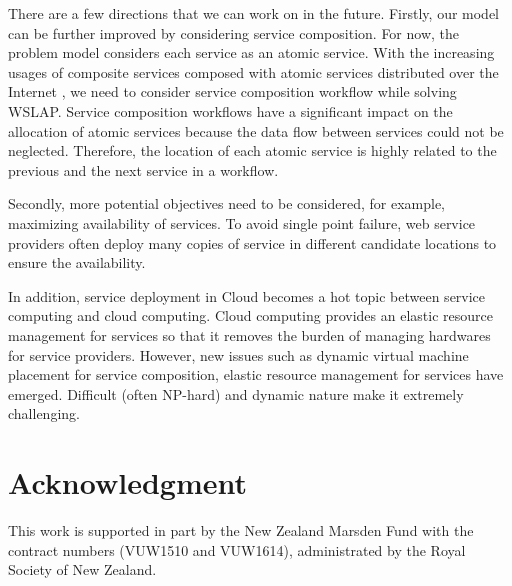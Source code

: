 \documentclass[10pt,journal,compsoc]{IEEEtran}
\begin{document}

There are a few directions that we can work on in the future. Firstly, our model can be further improved by considering service composition. For now, the problem model considers each service as an atomic service. With the increasing usages of composite services composed with atomic services distributed over the Internet \cite{6900416}, we need to consider service composition workflow while solving WSLAP.   Service composition workflows have a significant impact on the allocation of atomic services because the data flow between services could not be neglected. Therefore, the location of each atomic service is highly related to the previous and the next service in a workflow.

Secondly, more potential objectives need to be considered, for example, maximizing availability of services. To avoid single point failure, web service providers often deploy many copies of service in different candidate locations to ensure the availability. 

In addition, service deployment in Cloud becomes a hot topic between service computing and cloud computing. Cloud computing provides an elastic resource management for services so that it removes the burden of managing hardwares for service providers. However, new issues such as dynamic virtual machine placement for service composition, elastic resource management for services have emerged. Difficult (often NP-hard) and dynamic nature make it extremely challenging.




\section*{Acknowledgment}
This work is supported in part by the New Zealand Marsden Fund with the contract numbers (VUW1510 and VUW1614), administrated by the Royal Society of New Zealand.
\end{document}
